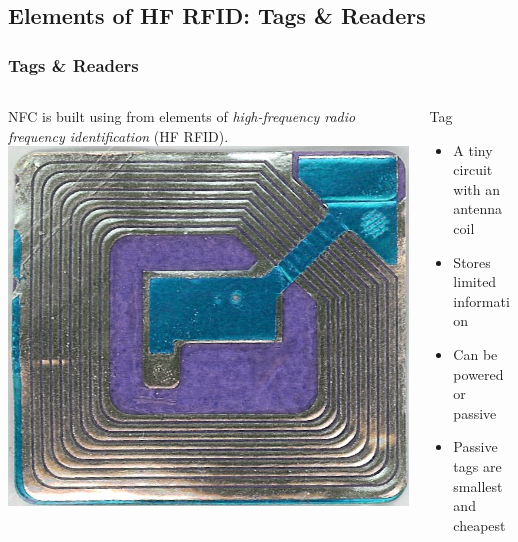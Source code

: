 \documentclass[unknownkeysallowed]{beamer}
\begin{document}
\subsection{Elements of HF RFID: Tags \& Readers}
\begin{frame}
\frametitle{Tags \& Readers}

  \begin{columns}[T]
    \begin{column}{.5\textwidth}
  		\begin{block}{}
  		  	\begin{center}
  			NFC is built using from elements of \textit{high-frequency radio frequency identification} (HF RFID).
  			\newline
  			\newline
    		\includegraphics[scale=.5]{figures/wikimediatag.jpg}
    		\end{center}
    	\end{block}
    \end{column}
    \begin{column}{.5\textwidth}
        \begin{block}{Tag}
		\begin{itemize}
		    \item{A tiny circuit with an antenna coil}
		    \item{Stores limited information}
		    \item{Can be powered or passive}
        	\item{Passive tags are smallest and cheapest}

\end{itemize}
\end{block}
\end{column}
\end{columns}
\end{frame}
\end{document}
